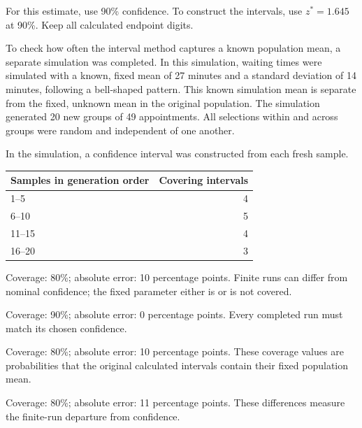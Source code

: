 For this estimate, use 90\% confidence. To construct the intervals, use $z^*=1.645$ at 90\%. Keep all calculated endpoint digits.

To check how often the interval method captures a known population mean, a separate simulation was completed. In this simulation, waiting times were simulated with a known, fixed mean of 27 minutes and a standard deviation of 14 minutes, following a bell-shaped pattern. This known simulation mean is separate from the fixed, unknown mean in the original population. The simulation generated 20 new groups of 49 appointments. All selections within and across groups were random and independent of one another.

In the simulation, a confidence interval was constructed from each fresh sample.
\begin{center}\begin{tabular}{@{}lr@{}}\toprule
Samples in generation order & Covering intervals\\\midrule
1--5 & 4 \\[6pt]
6--10 & 5 \\[6pt]
11--15 & 4 \\[6pt]
16--20 & 3 \\[6pt]
\bottomrule\end{tabular}\end{center}

\begin{answeroptions}
\item Coverage: 80\%; absolute error: 10 percentage points. Finite runs can differ from nominal confidence; the fixed parameter either is or is not covered.
\item Coverage: 90\%; absolute error: 0 percentage points. Every completed run must match its chosen confidence.
\item Coverage: 80\%; absolute error: 10 percentage points. These coverage values are probabilities that the original calculated intervals contain their fixed population mean.
\item Coverage: 80\%; absolute error: 11 percentage points. These differences measure the finite-run departure from confidence.
\end{answeroptions}
\clearpage
